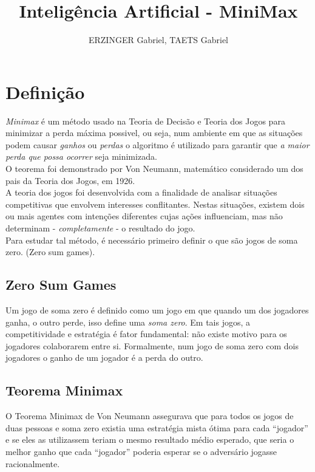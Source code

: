 \documentclass[]{article}
\title{Inteligência Artificial - MiniMax}
\author{ERZINGER Gabriel, TAETS Gabriel}
\begin{document}
\maketitle
	\section{Definição}
	\emph{Minimax} é um método usado na Teoria de Decisão e Teoria dos Jogos para minimizar a perda máxima possivel, ou seja, num ambiente em que as situações podem causar \emph{ganhos} ou \emph{perdas} o algoritmo é utilizado para garantir que \textit{a maior perda que possa ocorrer} seja minimizada. \\
	
	O teorema foi demonstrado por Von Neumann, matemático considerado um dos pais da Teoria dos Jogos, em 1926.\\
	
	A teoria dos jogos foi desenvolvida com a finalidade de analisar situações competitivas que envolvem interesses conflitantes. Nestas situações, existem dois ou mais agentes com intenções diferentes cujas ações influenciam,  mas não determinam - \emph{completamente} - o resultado do jogo. \\
	
	Para estudar tal método, é necessário primeiro definir o que são jogos de soma zero. (Zero sum games). 
	
	\subsection{Zero Sum Games}
	Um jogo de soma zero é definido como um jogo em que quando um dos jogadores ganha, o outro perde, isso define uma \emph{soma zero}. Em tais jogos, a competitividade e estratégia é fator fundamental: não existe motivo para os jogadores colaborarem entre si. Formalmente, num jogo de soma zero com dois jogadores o ganho de um jogador é a perda do outro.
	
	\subsection{Teorema Minimax}
	O Teorema Minimax de Von Neumann assegurava que para todos os jogos de duas pessoas e
	soma zero existia uma estratégia mista ótima para cada “jogador” e se eles as utilizassem
	teriam o mesmo resultado médio esperado, que seria o melhor ganho que cada “jogador”
	poderia esperar se o adversário jogasse racionalmente. \\
	
\end{document}
